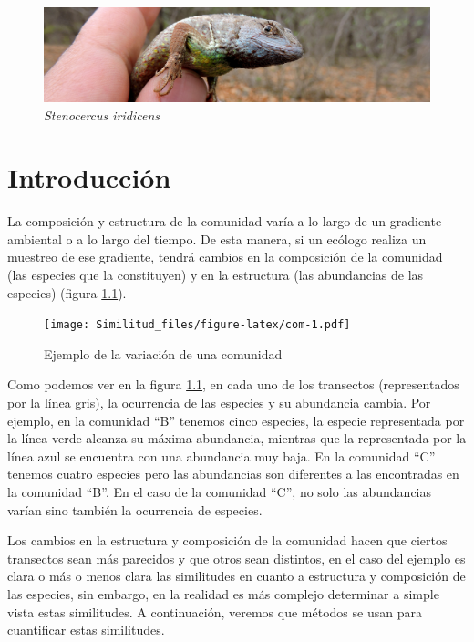 \documentclass[]{book}
\begin{document}
\begin{figure}[htbp]
\centering
\includegraphics{lagar.jpg}
\caption{\emph{Stenocercus iridicens}}
\end{figure}

\chapter{Introducción}\label{introduccion}

La composición y estructura de la comunidad varía a lo largo de un
gradiente ambiental o a lo largo del tiempo. De esta manera, si un
ecólogo realiza un muestreo de ese gradiente, tendrá cambios en la
composición de la comunidad (las especies que la constituyen) y en la
estructura (las abundancias de las especies) (figura \ref{fig:com}).

\begin{figure}[htbp]
\centering
\texttt{[image: Similitud\_files/figure-latex/com-1.pdf]}
\caption{\label{fig:com}Ejemplo de la variación de una comunidad}
\end{figure}

Como podemos ver en la figura \ref{fig:com}, en cada uno de los
transectos (representados por la línea gris), la ocurrencia de las
especies y su abundancia cambia. Por ejemplo, en la comunidad ``B''
tenemos cinco especies, la especie representada por la línea verde
alcanza su máxima abundancia, mientras que la representada por la línea
azul se encuentra con una abundancia muy baja. En la comunidad ``C''
tenemos cuatro especies pero las abundancias son diferentes a las
encontradas en la comunidad ``B''. En el caso de la comunidad ``C'', no
solo las abundancias varían sino también la ocurrencia de especies.

Los cambios en la estructura y composición de la comunidad hacen que
ciertos transectos sean más parecidos y que otros sean distintos, en el
caso del ejemplo es clara o más o menos clara las similitudes en cuanto
a estructura y composición de las especies, sin embargo, en la realidad
es más complejo determinar a simple vista estas similitudes. A
continuación, veremos que métodos se usan para cuantificar estas
similitudes.
\end{document}
